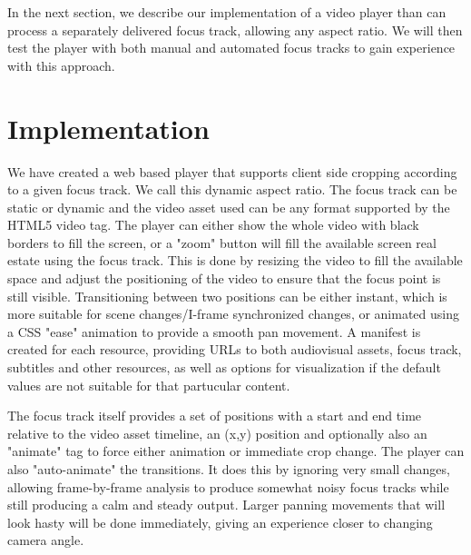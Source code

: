 \documentclass{aircc}
\begin{document}
In the next section, we describe our implementation of a video player than can
process a separately delivered focus track, allowing any aspect ratio. We
will then test the player with both manual and automated focus tracks to gain
experience with this approach.


\section{Implementation}

We have created a web based player that supports client side cropping
according to a given focus track. We call this dynamic aspect ratio. The
focus track can be static or dynamic and the video asset used can be any
format supported by the HTML5 video tag. The player can either show the whole
video with black borders to fill the screen, or a "zoom" button will fill the
available screen real estate using the focus track. This is done by resizing
the video to fill the available space and adjust the positioning of the video
to ensure that the focus point is still visible. Transitioning between two
positions can be either instant, which is more suitable for scene
changes/I-frame synchronized changes, or animated using a CSS "ease"
animation to provide a smooth pan movement. A manifest is created for each
resource, providing URLs to both audiovisual assets, focus track, subtitles
and other resources, as well as options for visualization if the default
values are not suitable for that partucular content.

The focus track itself provides a set of positions with a start and end time
relative to the video asset timeline, an (x,y) position and optionally also
an "animate" tag to force either animation or immediate crop change. The
player can also "auto-animate" the transitions. It does this by ignoring very
small changes, allowing frame-by-frame analysis to produce somewhat noisy
focus tracks while still producing a calm and steady output. Larger panning
movements that will look hasty will be done immediately, giving an experience
closer to changing camera angle.
\end{document}
